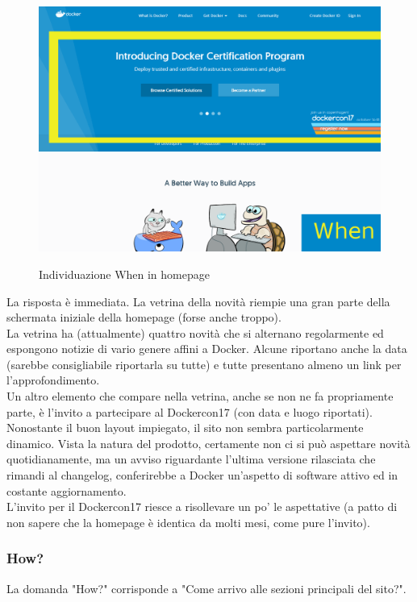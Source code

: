 \documentclass[a4paper]{article}
\begin{document}
\begin{figure}[H]
	\centering
	\includegraphics[width=\linewidth]{images/when.png}
    \label{fig:homepagewhen}
    \caption{Individuazione When in homepage}
\end{figure}

\noindent La risposta è immediata. La vetrina della novità riempie una gran parte della schermata iniziale della homepage (forse anche troppo).
\\
La vetrina ha (attualmente) quattro novità che si alternano regolarmente ed espongono notizie di vario genere affini a Docker. Alcune riportano anche la data (sarebbe consigliabile riportarla su tutte) e tutte presentano almeno un link per l'approfondimento.
\\
Un altro elemento che compare nella vetrina, anche se non ne fa propriamente parte, è l'invito a partecipare al Dockercon17 (con data e luogo riportati).
\\
Nonostante il buon layout impiegato, il sito non sembra particolarmente dinamico. Vista la natura del prodotto, certamente non ci si può aspettare novità quotidianamente, ma un avviso riguardante l'ultima versione rilasciata che rimandi al changelog, conferirebbe a Docker un'aspetto di software attivo ed in costante aggiornamento.
\\
L'invito per il Dockercon17 riesce a risollevare un po' le aspettative (a patto di non sapere che la homepage è identica da molti mesi, come pure l'invito).

\newpage
\subsubsection{How?}
La domanda "How?" corrisponde a "Come arrivo alle sezioni principali del sito?".
\end{document}
